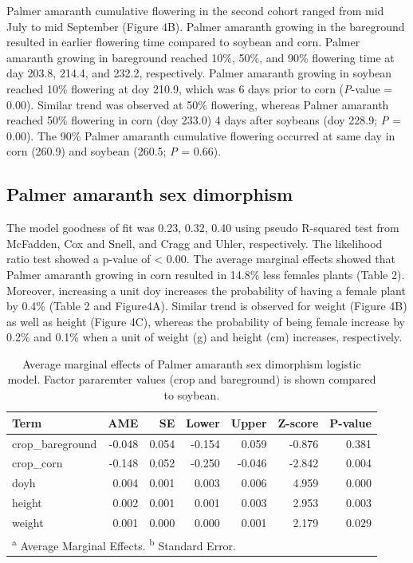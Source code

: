 \documentclass[utf8]{frontiersSCNS}
\begin{document}
Palmer amaranth cumulative flowering in the second cohort ranged from
mid July to mid September (Figure 4B). Palmer amaranth growing in the
bareground resulted in earlier flowering time compared to soybean and
corn. Palmer amaranth growing in bareground reached 10\%, 50\%, and 90\%
flowering time at day 203.8, 214.4, and 232.2, respectively. Palmer
amaranth growing in soybean reached 10\% flowering at doy 210.9, which
was 6 days prior to corn (\emph{P}-value = 0.00). Similar trend was
observed at 50\% flowering, whereas Palmer amaranth reached 50\%
flowering in corn (doy 233.0) 4 days after soybeans (doy 228.9; \emph{P}
= 0.00). The 90\% Palmer amaranth cumulative flowering occurred at same
day in corn (260.9) and soybean (260.5; \emph{P} = 0.66).

\hypertarget{palmer-amaranth-sex-dimorphism}{%
\subsection*{Palmer amaranth sex
dimorphism}\label{palmer-amaranth-sex-dimorphism}}

The model goodness of fit was 0.23, 0.32, 0.40 using pseudo R-squared
test from McFadden, Cox and Snell, and Cragg and Uhler, respectively.
The likelihood ratio test showed a p-value of \textless{} 0.00. The
average marginal effects showed that Palmer amaranth growing in corn
resulted in 14.8\% less females plants (Table 2). Moreover, increasing a
unit doy increases the probability of having a female plant by 0.4\%
(Table 2 and Figure4A). Similar trend is observed for weight (Figure 4B)
as well as height (Figure 4C), whereas the probability of being female
increase by 0.2\% and 0.1\% when a unit of weight (g) and height (cm)
increases, respectively.

\begin{table}[!h]

\caption{\label{tab:unnamed-chunk-3}Average marginal effects of Palmer amaranth sex dimorphism logistic model. Factor pararemter values (crop and bareground) is shown compared to soybean.}
\centering
\fontsize{10}{12}\selectfont
\begin{tabular}[t]{lrrrrrr}
\toprule
Term & AME & SE & Lower & Upper & Z-score & P-value\\
\midrule
crop\_bareground & -0.048 & 0.054 & -0.154 & 0.059 & -0.876 & 0.381\\

crop\_corn & -0.148 & 0.052 & -0.250 & -0.046 & -2.842 & 0.004\\

doyh & 0.004 & 0.001 & 0.003 & 0.006 & 4.959 & 0.000\\

height & 0.002 & 0.001 & 0.001 & 0.003 & 2.953 & 0.003\\

weight & 0.001 & 0.000 & 0.000 & 0.001 & 2.179 & 0.029\\
\bottomrule
\multicolumn{7}{l}{\rule{0pt}{1em}\textsuperscript{a} Average Marginal Effects. \textsuperscript{b} Standard Error.}\\
\end{tabular}
\end{table}
\end{document}
